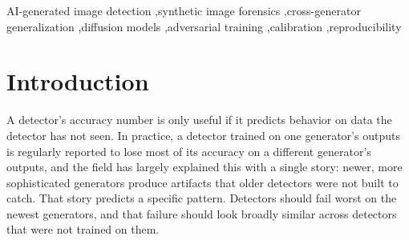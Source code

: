 \documentclass[3p,times,procedia]{elsarticle}
\begin{document}
\begin{frontmatter}
\begin{abstract}
reproducibility finding: a resize convention that is rarely specified in
released code moves the same checkpoint's reported accuracy on the same
benchmark by more than 15 points, in opposite directions for two
checkpoints trained on identical data, which we trace, replicate on a
second generator, and decompose into a recoverable threshold shift and an
information-destroying input distortion. Adversarial training on
on-manifold latent perturbations (a published method we evaluate but did
not modify) raises mean fake-accuracy from 66.2\% to 98.7\% and yields the
best-calibrated detector we test. We also report two cautions that apply
beyond our own pipeline: the strongest detector on clean FLUX.1 data
(98.0\% fake-accuracy) drops to chance-level AUC under ordinary JPEG
re-encoding, and every generator in these benchmarks ships generated images
as PNG against JPEG reals, a compression confound that inflates absolute
accuracies. Everything is produced by inference over existing checkpoints
and released datasets, with no training and no image generation, so the
pipeline is reproducible on a single consumer GPU.
\end{abstract}

\begin{keyword}
AI-generated image detection \sep synthetic image forensics \sep cross-generator generalization \sep diffusion models \sep adversarial training \sep calibration \sep reproducibility
\end{keyword}
\end{frontmatter}


\vspace*{-6pt}

\section{Introduction}
\label{sec:intro}

A detector's accuracy number is only useful if it predicts behavior on data
the detector has not seen. In practice, a detector trained on one
generator's outputs is regularly reported to lose most of its accuracy on a
different generator's outputs, and the field has largely explained this with
a single story: newer, more sophisticated generators produce artifacts that
older detectors were not built to catch. That story predicts a specific
pattern. Detectors should fail worst on the newest generators, and that
failure should look broadly similar across detectors that were not trained
on them.
\end{document}
